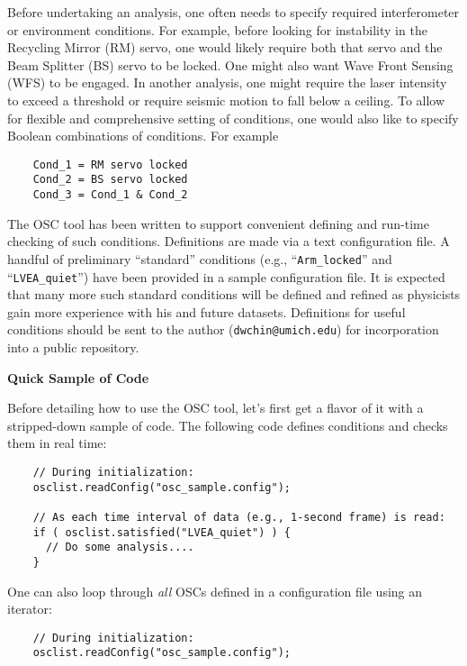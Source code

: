 {Before undertaking an analysis, one often needs to specify required
interferometer or environment conditions.  For example, before looking
for instability in the Recycling Mirror (RM) servo, one would likely
require both that servo and the Beam Splitter (BS) servo to be locked.
One might also want Wave Front Sensing (WFS) to be engaged.  In
another analysis, one might require the laser intensity to exceed a
threshold or require seismic motion to fall below a ceiling. To allow
for flexible and comprehensive setting of conditions, one would also
like to specify Boolean combinations of conditions. For example

\begin{verbatim}
    Cond_1 = RM servo locked
    Cond_2 = BS servo locked
    Cond_3 = Cond_1 & Cond_2 
\end{verbatim}

The OSC tool has been written to support convenient defining and
run-time checking of such conditions. Definitions are made via a
text configuration file. A handful of preliminary ``standard'' 
conditions (e.g., ``\texttt{Arm\_locked}'' and ``\texttt{LVEA\_quiet}'') 
have been provided in a sample configuration file.  It is
expected that many more such standard conditions will be defined and
refined as physicists gain more experience with his and future
datasets. Definitions for useful conditions should be sent to the
author (\texttt{dwchin@umich.edu}) for incorporation into a public
repository.

\begin{center}
  \textbf{\large Quick Sample of Code}
\end{center}

Before detailing how to use the OSC tool, let's first get a flavor of
it with a stripped-down sample of code. The following code defines
conditions and checks them in real time:

\begin{verbatim}
    // During initialization:
    osclist.readConfig("osc_sample.config");
  
    // As each time interval of data (e.g., 1-second frame) is read: 
    if ( osclist.satisfied("LVEA_quiet") ) {
      // Do some analysis....
    }
\end{verbatim}

One can also loop through \textit{all} OSCs defined in a configuration
file using an iterator:
\begin{verbatim}
    // During initialization:
    osclist.readConfig("osc_sample.config");


\end{verbatim}}
